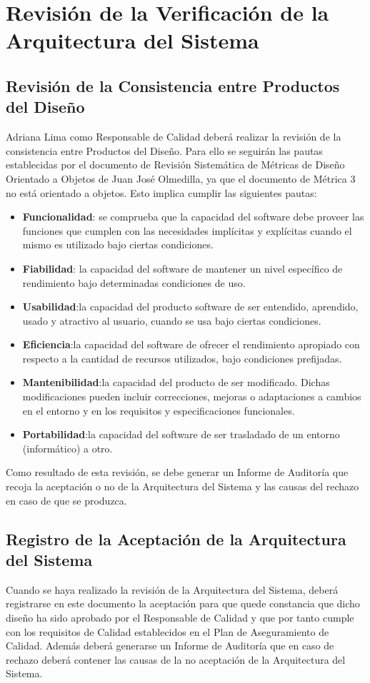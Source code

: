 \section{Revisión de la Verificación de la Arquitectura del Sistema}
\subsection{Revisión de la Consistencia entre Productos del Diseño}

\par Adriana Lima como Responsable de Calidad deberá realizar la revisión de la consistencia entre Productos del Diseño. Para ello se seguirán las pautas establecidas por el documento de Revisión Sistemática de Métricas de Diseño Orientado a Objetos de Juan José Olmedilla, ya que el documento de Métrica 3 no está orientado a objetos. Esto implica cumplir las siguientes pautas:
\begin{itemize}
\item \textbf{Funcionalidad}: se comprueba que la capacidad del software debe proveer las funciones que cumplen con las necesidades implícitas y explícitas cuando el mismo es utilizado bajo ciertas condiciones.
\item \textbf{Fiabilidad}: la capacidad del software de mantener un nivel específico de rendimiento bajo determinadas condiciones de uso.
\item \textbf{Usabilidad}:la capacidad del producto software de ser entendido, aprendido, usado y atractivo al usuario, cuando se usa bajo ciertas condiciones.
\item \textbf{Eficiencia}:la capacidad del software de ofrecer el rendimiento apropiado con respecto a la cantidad de recursos utilizados, bajo condiciones prefijadas.
\item \textbf{Mantenibilidad}:la capacidad del producto de ser modificado. Dichas modificaciones pueden incluir correcciones, mejoras o adaptaciones a cambios en el entorno y en los requisitos y especificaciones funcionales.
\item \textbf{Portabilidad}:la capacidad del software de ser trasladado de un entorno (informático) a otro.
\end{itemize}

\par Como resultado de esta revisión, se debe generar un Informe de Auditoría que recoja la aceptación o no de la Arquitectura del Sistema y las causas del rechazo en caso de que se produzca.


\subsection{Registro de la Aceptación de la Arquitectura del Sistema}
\par Cuando se haya realizado la revisión de la Arquitectura del Sistema, deberá registrarse en este documento la aceptación para que quede constancia que dicho diseño ha sido aprobado por el Responsable de Calidad y que por tanto cumple con los requisitos de Calidad establecidos en el Plan de Aseguramiento de Calidad. Además deberá generarse un Informe de Auditoría que en caso de rechazo deberá contener las causas de la no aceptación de la Arquitectura del Sistema.
